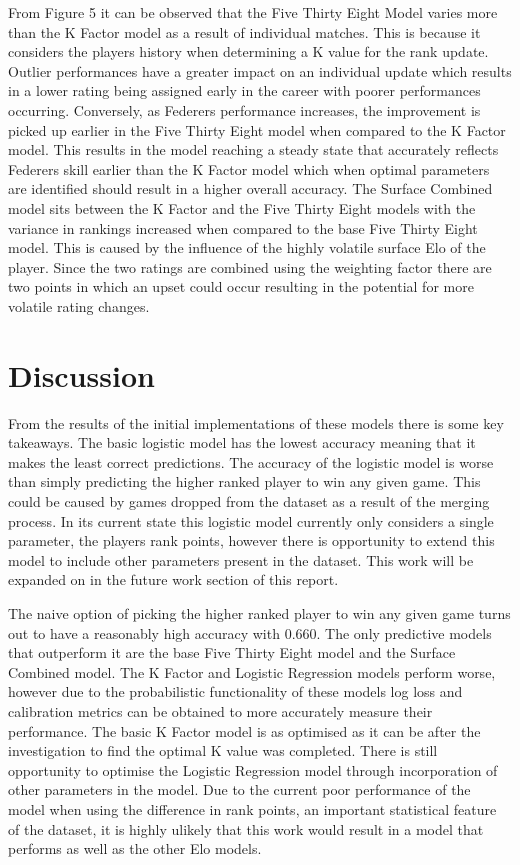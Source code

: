 \documentclass[12pt,a4paper]{article}
\begin{document}
From Figure 5 it can be observed that the Five Thirty Eight Model varies more than the
K Factor model as a result of individual matches. This is because it considers the players
history when determining a K value for the rank update. Outlier performances have a greater
impact on an individual update which results in a lower rating being assigned early in the
career with poorer performances occurring. Conversely, as Federers performance increases,
the improvement is picked up earlier in the Five Thirty Eight model when compared to the
K Factor model. This results in the model reaching a steady state that accurately reflects
Federers skill earlier than the K Factor model which when optimal parameters are identified
should result in a higher overall accuracy. The Surface Combined model sits between the
K Factor and the Five Thirty Eight models with the variance in rankings increased when compared
to the base Five Thirty Eight model. This is caused by the influence of the highly volatile
surface Elo of the player. Since the two ratings are combined using the weighting factor there
are two points in which an upset could occur resulting in the potential for more volatile
rating changes.

\vspace{10mm}
\noindent \hrulefill

\clearpage
\section{Discussion}
From the results of the initial implementations of these models there is some key
takeaways. The basic logistic model has the lowest accuracy meaning that it
makes the least correct predictions. The accuracy of the logistic model is
worse than simply predicting the higher ranked player to win any given game. This could be
caused by games dropped from the dataset as a result of the merging process.
In its current state this logistic model currently only
considers a single parameter, the players rank points, however there is opportunity to
extend this model to include other parameters present in the dataset. This work will be expanded
on in the future work section of this report.

The naive option of picking the higher ranked player to win any given game turns out to have
a reasonably high accuracy with 0.660. The only predictive models that outperform it are the base
Five Thirty Eight model and the Surface Combined model. The K Factor and Logistic Regression models
perform worse, however due to the probabilistic functionality of these models log loss and calibration
metrics can be obtained to more accurately measure their performance. The basic K Factor model
is as optimised as it can be after the investigation to find the optimal K value was completed.
There is still opportunity to optimise the Logistic Regression model through incorporation of
other parameters in the model. Due to the current poor performance of the model when using
the difference in rank points, an important statistical feature of the dataset, it is highly ulikely
that this work would result in a model that performs as well as the other Elo models.
\end{document}
